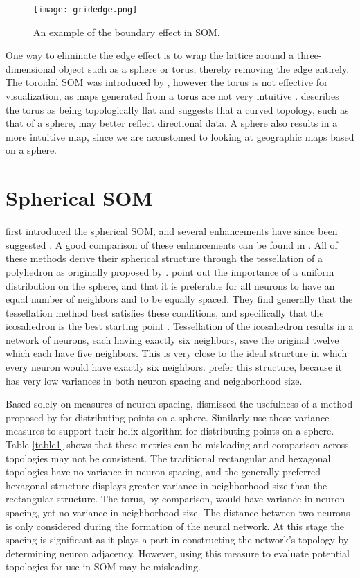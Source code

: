 \begin{figure}[htb]
\centering
\texttt{[image: gridedge.png]}
\caption{An example of the boundary effect in SOM.}
\label{som:states}
\end{figure}

One way to eliminate the edge effect is to wrap the lattice around a
three-dimensional object such as a sphere or torus, thereby removing the edge
entirely. The toroidal SOM was introduced by \cite{li1993}, however the torus
is not effective for visualization, as maps generated from a torus are not
very intuitive \citep{ito2000,wu2006}.  \cite{ritter99} describes the torus as
being topologically flat and suggests that a curved topology, such as that of
a sphere, may better reflect directional data.  A sphere also results in a
more intuitive map, since we are accustomed to looking at geographic maps
based on a sphere.  

\section{Spherical SOM}
\label{bg:sphere}
\cite{ritter99} first introduced the spherical SOM, and several enhancements have
since been suggested \citep{boudjemai2003,sangole03,Nishio:2006fk,wu2006}.  A
good comparison of these enhancements can be found in \cite{wu2006}.  All of
these methods derive their spherical structure through the tessellation of a
polyhedron as originally proposed by \cite{ritter99}.  \cite{wu2006} point
out the importance of a uniform distribution on the sphere, and that it is
preferable for all neurons to have an equal number of neighbors and to be
equally spaced.  They find generally that the tessellation method best satisfies
these conditions, and specifically that the icosahedron is the best starting
point \citep{wu2005}. Tessellation of the icosahedron results in a network of
neurons, each having exactly six neighbors, save the original twelve
which each have five neighbors.  This is very close to the ideal structure in
which every neuron would have exactly six neighbors.  \cite{wu2006} prefer
this structure, because it has very low variances in both neuron spacing
and neighborhood size. 

Based solely on measures of neuron spacing, \cite{wu2005} dismissed the usefulness of a method
proposed by \cite{Rakhmanov94} for distributing points on a sphere.  Similarly
\cite{Nishio:2006fk} use these variance measures to support their helix
algorithm for distributing points on a sphere.  Table \ref{table1} shows that
these metrics can be misleading and comparison across topologies may not be
consistent.  The traditional rectangular and hexagonal topologies have no
variance in neuron spacing, and the generally preferred hexagonal structure
displays greater variance in neighborhood size than the rectangular structure.
The torus, by comparison, would have variance in neuron spacing, yet no
variance in neighborhood size.  The distance between two neurons is only
considered during the formation of the neural network.  At this stage the
spacing is significant as it plays a part in constructing the network's
topology by determining neuron adjacency.  However, using this measure to
evaluate potential topologies for use in SOM may be misleading.

